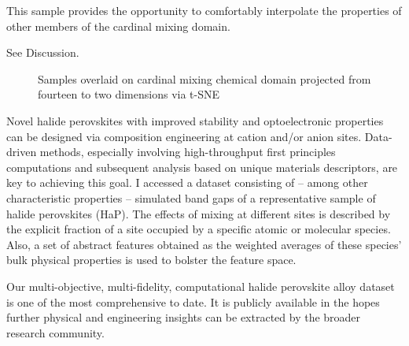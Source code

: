 This sample provides the opportunity to comfortably interpolate the properties of other members of the cardinal mixing domain.

See Discussion.

 
\begin{figure}[htbp]
\centering

\caption{\label{fig:coverage} Samples overlaid on cardinal mixing chemical domain projected from fourteen to two dimensions via t-SNE}
\end{figure}

Novel halide perovskites with improved stability and optoelectronic properties can be designed via composition engineering at cation and/or anion sites.
Data-driven methods, especially involving high-throughput first principles computations and subsequent analysis based on unique materials descriptors, are key to achieving this goal.
I accessed a dataset consisting of -- among other characteristic properties -- simulated band gaps of a representative sample of halide perovskites (HaP).
The effects of mixing at different sites is described by the explicit fraction of a site occupied by a specific atomic or molecular species.
Also, a set of abstract features obtained as the weighted averages of these species' bulk physical properties is used to bolster the feature space.

Our multi-objective, multi-fidelity, computational halide perovskite alloy dataset is one of the most comprehensive to date.
It is publicly available in the hopes further physical and engineering insights can be extracted by the broader research community.
